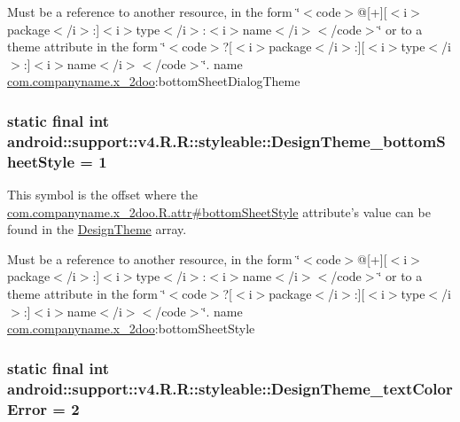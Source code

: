 Must be a reference to another resource, in the form \char`\"{}$<$code$>$@\mbox{[}+\mbox{]}\mbox{[}$<$i$>$package$<$/i$>$:\mbox{]}$<$i$>$type$<$/i$>$:$<$i$>$name$<$/i$>$$<$/code$>$\char`\"{} or to a theme attribute in the form \char`\"{}$<$code$>$?\mbox{[}$<$i$>$package$<$/i$>$:\mbox{]}\mbox{[}$<$i$>$type$<$/i$>$:\mbox{]}$<$i$>$name$<$/i$>$$<$/code$>$\char`\"{}.  name \hyperlink{namespacecom_1_1companyname_1_1x__2doo}{com.companyname.x\_\-2doo}:bottomSheetDialogTheme \hypertarget{classandroid_1_1support_1_1v4_1_1_r_1_1styleable_b70c83958d9304b700d491f7de3a0af7}{
\subsubsection[{DesignTheme\_\-bottomSheetStyle}]{\setlength{\rightskip}{0pt plus 5cm}static final int android::support::v4.R.R::styleable::DesignTheme\_\-bottomSheetStyle = 1}}
\label{classandroid_1_1support_1_1v4_1_1_r_1_1styleable_b70c83958d9304b700d491f7de3a0af7}


This symbol is the offset where the \hyperlink{classcom_1_1companyname_1_1x__2doo_1_1_r_1_1attr_cdb4a98eb0eebeb8446ab94f8529f4de}{com.companyname.x\_\-2doo.R.attr\#bottomSheetStyle} attribute's value can be found in the \hyperlink{classandroid_1_1support_1_1v4_1_1_r_1_1styleable_1fc2363c6b6b67c6e45666c3b79caadd}{DesignTheme} array.

Must be a reference to another resource, in the form \char`\"{}$<$code$>$@\mbox{[}+\mbox{]}\mbox{[}$<$i$>$package$<$/i$>$:\mbox{]}$<$i$>$type$<$/i$>$:$<$i$>$name$<$/i$>$$<$/code$>$\char`\"{} or to a theme attribute in the form \char`\"{}$<$code$>$?\mbox{[}$<$i$>$package$<$/i$>$:\mbox{]}\mbox{[}$<$i$>$type$<$/i$>$:\mbox{]}$<$i$>$name$<$/i$>$$<$/code$>$\char`\"{}.  name \hyperlink{namespacecom_1_1companyname_1_1x__2doo}{com.companyname.x\_\-2doo}:bottomSheetStyle \hypertarget{classandroid_1_1support_1_1v4_1_1_r_1_1styleable_0574e76a7adf8330c0f630fbe9312cc2}{
\subsubsection[{DesignTheme\_\-textColorError}]{\setlength{\rightskip}{0pt plus 5cm}static final int android::support::v4.R.R::styleable::DesignTheme\_\-textColorError = 2}}
\label{classandroid_1_1support_1_1v4_1_1_r_1_1styleable_0574e76a7adf8330c0f630fbe9312cc2}



